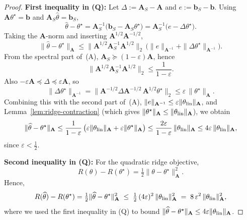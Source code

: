 \documentclass{article}
\def\amat{\mathbf{A}}
\def\bvec{\mathbf{b}}
\newcommand{\1}{\mathbbm{1}}
\begin{document}
\begin{proof}
\medskip
\noindent\textbf{First inequality in (Q):}
Let $\Delta := \amat_S - \amat$ and $e := \bvec_S - \bvec$.
Using $\amat\theta^\star=\bvec$ and $\amat_S\widehat\theta=\bvec_S$,
\[
\widehat\theta-\theta^\star
= \amat_S^{-1}\big(\bvec_S - \amat_S\theta^\star\big)
= \amat_S^{-1}\big(e - \Delta\theta^\star\big).
\]
Taking the $\amat$-norm and inserting $\amat^{1/2}\amat^{-1/2}$,
\[
\|\widehat\theta-\theta^\star\|_{\amat}
\le
\|\amat^{1/2}\amat_S^{-1}\amat^{1/2}\|_2\,
\big(\|e\|_{\amat^{-1}}+\|\Delta\theta^\star\|_{\amat^{-1}}\big).
\]
From the spectral part of~(A), $\amat_S\succeq(1-\varepsilon)\amat$, hence
\[
\|\amat^{1/2}\amat_S^{-1}\amat^{1/2}\|_2 \le \frac{1}{1-\varepsilon}.
\]
Also $-\varepsilon\amat\preceq \Delta \preceq \varepsilon\amat$, so
\[
\|\Delta\theta^\star\|_{\amat^{-1}}
= \|\amat^{-1/2}\Delta\amat^{-1/2}\,\amat^{1/2}\theta^\star\|_2
\le \varepsilon\,\|\theta^\star\|_{\amat}.
\]
Combining this with the second part of~(A), $\|e\|_{\amat^{-1}}\le \varepsilon\|\theta_{\rm lin}\|_{\amat}$, and Lemma~\ref{lem:ridge-contraction} (which gives $\|\theta^\star\|_{\amat}\le \|\theta_{\rm lin}\|_{\amat}$), we obtain
\[
\|\widehat\theta-\theta^\star\|_{\amat}
\le \frac{1}{1-\varepsilon}\,\big(\varepsilon\|\theta_{\rm lin}\|_{\amat}+\varepsilon\|\theta^\star\|_{\amat}\big)
\le \frac{2\varepsilon}{1-\varepsilon}\,\|\theta_{\rm lin}\|_{\amat}
\le 4\varepsilon\,\|\theta_{\rm lin}\|_{\amat},
\]
since $\varepsilon<\tfrac12$.


\medskip
\noindent\textbf{Second inequality in (Q):}
For the quadratic ridge objective,
\[
R(\theta)-R(\theta^\star)=\tfrac12\|\theta-\theta^\star\|_{\amat}^2.
\]
Hence,
\[
R(\widehat\theta)-R(\theta^\star)
=\tfrac12\|\widehat\theta-\theta^\star\|_{\amat}^2
\;\le\; \tfrac12\,(4\varepsilon)^2\,\|\theta_{\rm lin}\|_{\amat}^2
\;=\; 8\,\varepsilon^2\,\|\theta_{\rm lin}\|_{\amat}^2,
\]
where we used the first inequality in (Q) to bound
$\|\widehat\theta-\theta^\star\|_{\amat}\le 4\varepsilon\|\theta_{\rm lin}\|_{\amat}$.

\end{proof}




\end{document}
